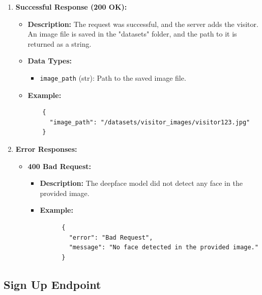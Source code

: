\documentclass[a4 paper, 12pt]{article}
\begin{document}
\begin{enumerate}
  \item \textbf{Successful Response (200 OK):}
  \begin{itemize}
    \item \textbf{Description:} The request was successful, and the server adds the visitor. An image file is saved in the "datasets" folder, and the path to it is returned as a string.
    \item \textbf{Data Types:}
    \begin{itemize}
      \item \texttt{image\_path} (str): Path to the saved image file.
    \end{itemize}
    \item \textbf{Example:}
    \begin{verbatim}
    {
      "image_path": "/datasets/visitor_images/visitor123.jpg"
    }
    \end{verbatim}
  \end{itemize}

  \item \textbf{Error Responses:}
  \begin{itemize}
    \item \textbf{400 Bad Request:}
    \begin{itemize}
      \item \textbf{Description:} The deepface model did not detect any face in the provided image.
      \item \textbf{Example:}
      \begin{verbatim}
      {
        "error": "Bad Request",
        "message": "No face detected in the provided image."
      }
      \end{verbatim}
    \end{itemize}
  \end{itemize}
\end{enumerate}
\subsection{Sign Up Endpoint}
\end{document}
